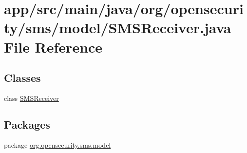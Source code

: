 \hypertarget{a00029}{\section{app/src/main/java/org/opensecurity/sms/model/\+S\+M\+S\+Receiver.java File Reference}
\label{a00029}
}
\subsection*{Classes}
\begin{DoxyCompactItemize}
\item 
class \hyperlink{a00016}{S\+M\+S\+Receiver}
\end{DoxyCompactItemize}
\subsection*{Packages}
\begin{DoxyCompactItemize}
\item 
package \hyperlink{a00036}{org.\+opensecurity.\+sms.\+model}
\end{DoxyCompactItemize}
